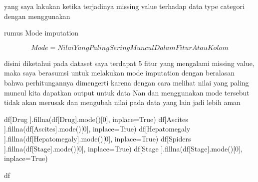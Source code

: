 \documentclass[
  letterpaper,
]{krantz}
\makeatletter
\newenvironment{Shaded}{\begin{snugshade}}{\end{snugshade}}
\newcommand{\DecValTok}[1]{\textcolor[rgb]{0.68,0.00,0.00}{#1}}
\newcommand{\NormalTok}[1]{\textcolor[rgb]{0.00,0.23,0.31}{#1}}
\newcommand{\OperatorTok}[1]{\textcolor[rgb]{0.37,0.37,0.37}{#1}}
\newcommand{\StringTok}[1]{\textcolor[rgb]{0.13,0.47,0.30}{#1}}
\newcommand{\VariableTok}[1]{\textcolor[rgb]{0.07,0.07,0.07}{#1}}
\newenvironment{kframe}{%
\medskip{}
\setlength{\fboxsep}{.8em}
 \def\at@end@of@kframe{}%
 \ifinner\ifhmode%
  \def\at@end@of@kframe{\end{minipage}}%
  \begin{minipage}{\columnwidth}%
 \fi\fi%
 \def\FrameCommand##1{\hskip\@totalleftmargin \hskip-\fboxsep
 \colorbox{shadecolor}{##1}\hskip-\fboxsep
     \hskip-\linewidth \hskip-\@totalleftmargin \hskip\columnwidth}%
 \MakeFramed {\advance\hsize-\width
   \@totalleftmargin\z@ \linewidth\hsize
   \@setminipage}}%
 {\par\unskip\endMakeFramed%
 \at@end@of@kframe}
\renewenvironment{Shaded}{\begin{kframe}}{\end{kframe}}
\makeatother
\begin{document}
yang saya lakukan ketika terjadinya missing value terhadap data type
categori dengan menggunakan

rumus Mode imputation

\[
Mode=Nilai Yang Paling Sering Muncul Dalam Fitur Atau Kolom
\]

disini diketahui pada dataset saya terdapat 5 fitur yang mengalami
missing value, maka saya berasumsi untuk melakukan mode imputation
dengan beralasan bahwa perhitungannya dimengerti karena dengan cara
melihat nilai yang paling muncul kita dapatkan output untuk data Nan dan
menggunakan mode tersebut tidak akan merusak dan mengubah nilai pada
data yang lain jadi lebih aman

\begin{Shaded}
\begin{Highlighting}[]
\NormalTok{df[}\StringTok{\textquotesingle{}Drug\textquotesingle{}}\NormalTok{   ].fillna(df[}\StringTok{\textquotesingle{}Drug\textquotesingle{}}\NormalTok{].mode()[}\DecValTok{0}\NormalTok{], inplace}\OperatorTok{=}\VariableTok{True}\NormalTok{)}
\NormalTok{df[}\StringTok{\textquotesingle{}Ascites\textquotesingle{}}\NormalTok{    ].fillna(df[}\StringTok{\textquotesingle{}Ascites\textquotesingle{}}\NormalTok{].mode()[}\DecValTok{0}\NormalTok{], inplace}\OperatorTok{=}\VariableTok{True}\NormalTok{)}
\NormalTok{df[}\StringTok{\textquotesingle{}Hepatomegaly\textquotesingle{}}\NormalTok{   ].fillna(df[}\StringTok{\textquotesingle{}Hepatomegaly\textquotesingle{}}\NormalTok{].mode()[}\DecValTok{0}\NormalTok{], inplace}\OperatorTok{=}\VariableTok{True}\NormalTok{)}
\NormalTok{df[}\StringTok{\textquotesingle{}Spiders\textquotesingle{}}\NormalTok{    ].fillna(df[}\StringTok{\textquotesingle{}Stage\textquotesingle{}}\NormalTok{].mode()[}\DecValTok{0}\NormalTok{], inplace}\OperatorTok{=}\VariableTok{True}\NormalTok{)}
\NormalTok{df[}\StringTok{\textquotesingle{}Stage\textquotesingle{}}\NormalTok{  ].fillna(df[}\StringTok{\textquotesingle{}Stage\textquotesingle{}}\NormalTok{].mode()[}\DecValTok{0}\NormalTok{], inplace}\OperatorTok{=}\VariableTok{True}\NormalTok{)}

\NormalTok{df}
\end{Highlighting}
\end{Shaded}
\end{document}
